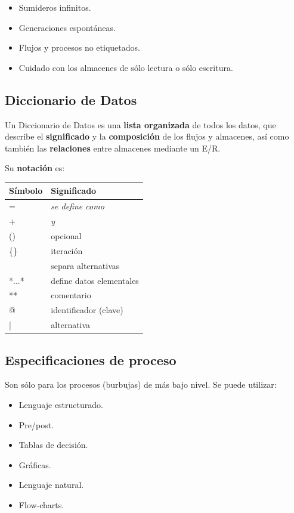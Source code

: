 \begin{itemize}[noitemsep]
\item Sumideros infinitos.
\item Generaciones espontáneas.
\item Flujos y procesos no etiquetados.
\item Cuidado con los almacenes de sólo lectura o sólo escritura.
\end{itemize}


\subsection{Diccionario de Datos} %
Un Diccionario de Datos es una \textbf{lista organizada} de todos los datos, que describe el \textbf{significado} y la \textbf{composición} de los flujos y almacenes, así como también las \textbf{relaciones} entre almacenes mediante un E/R.

Su \textbf{notación} es:

\begin{center}
  \begin{tabular}[h]{ l | l }
    \textbf{Símbolo}   & \textbf{Significado} \\
    \hline
    =                  & \textit{se define como} \\
    +                  & \textit{y} \\
    ()                 & opcional \\
    \{\}               & iteración \\
    \big[\big]         & separa alternativas \\
    *...*              & define datos elementales \\
    **                 & comentario \\
    @                  & identificador (clave) \\
    |                  & alternativa \\
  \end{tabular}
\end{center}

\subsection{Especificaciones de proceso}

Son sólo para los procesos (burbujas) de más bajo nivel. Se puede utilizar:

\begin{itemize}[noitemsep]
\item Lenguaje estructurado.
\item Pre/post.
\item Tablas de decisión.
\item Gráficas.
\item Lenguaje natural.
\item Flow-charts.
\end{itemize}

